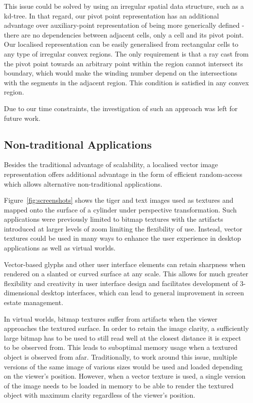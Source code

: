 \documentclass[11pt,a4paper,twoside]{article}
\begin{document}
This issue could be solved by using an irregular spatial data structure, such as a kd-tree. In that regard, our pivot point representation has an additional advantage over auxiliary-point representation of being more generically defined - there are no dependencies between adjacent cells, only a cell and its pivot point. Our localised representation can be easily generalised from rectangular cells to any type of irregular convex regions. The only requirement is that a ray cast from the pivot point towards an arbitrary point within the region cannot intersect its boundary, which would make the winding number depend on the intersections with the segments in the adjacent region. This condition is satisfied in any convex region.

Due to our time constraints, the investigation of such an approach was left for future work.

\subsection {Non-traditional Applications}

Besides the traditional advantage of scalability, a localised vector image representation offers additional advantage in the form of efficient random-access which allows alternative non-traditional applications.

Figure~\ref{fig:screenshots} shows the tiger and text images used as textures and mapped onto the surface of a cylinder under perspective transformation. Such applications were previously limited to bitmap textures with the artifacts introduced at larger levels of zoom limiting the flexibility of use. Instead, vector textures could be used in many ways to enhance the user experience in desktop applications as well as virtual worlds.

Vector-based glyphs and other user interface elements can retain sharpness when rendered on a slanted or curved surface at any scale. This allows for much greater flexibility and creativity in user interface design and facilitates development of 3-dimensional desktop interfaces, which can lead to general improvement in screen estate management.

In virtual worlds, bitmap textures suffer from artifacts when the viewer approaches the textured surface. In order to retain the image clarity, a sufficiently large bitmap has to be used to still read well at the closest distance it is expect to be observed from. This leads to suboptimal memory usage when a textured object is observed from afar. Traditionally, to work around this issue, multiple versions of the same image of various sizes would be used and loaded depending on the viewer's position. However, when a vector texture is used, a single version of the image needs to be loaded in memory to be able to render the textured object with maximum clarity regardless of the viewer's position.
\end{document}
